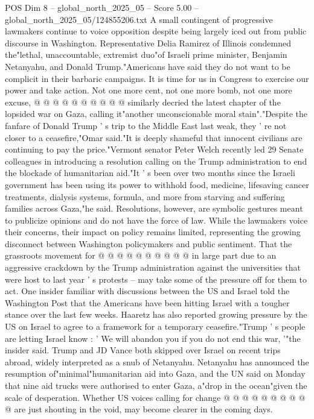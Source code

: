 \begin{textsample}{POS Dim 8 – global\_north\_2025\_05 – Score 5.00 – global\_north\_2025\_05/124855206.txt}
A small contingent of progressive lawmakers continue to voice opposition despite being largely iced out from public discourse in Washington.
Representative Delia Ramirez of Illinois condemned the"lethal, unaccountable, extremist duo"of Israeli prime minister, Benjamin Netanyahu, and Donald Trump."Americans have said they do not want to be complicit in their barbaric campaigns.
It is time for us in Congress to exercise our power and take action.
Not one more cent, not one more bomb, not one more excuse, @ @ @ @ @ @ @ @ @ @ similarly decried the latest chapter of the lopsided war on Gaza, calling it"another unconscionable moral stain"."Despite the fanfare of Donald Trump ' s trip to the Middle East last weak, they ' re not closer to a ceasefire,"Omar said."It is deeply shameful that innocent civilians are continuing to pay the price."Vermont senator Peter Welch recently led 29 Senate colleagues in introducing a resolution calling on the Trump administration to end the blockade of humanitarian aid."It ' s been over two months since the Israeli government has been using its power to withhold food, medicine, lifesaving cancer treatments, dialysis systems, formula, and more from starving and suffering families across Gaza,"he said.
Resolutions, however, are symbolic gestures meant to publicize opinions and do not have the force of law.
While the lawmakers voice their concerns, their impact on policy remains limited, representing the growing disconnect between Washington policymakers and public sentiment.
That the grassroots movement for @ @ @ @ @ @ @ @ @ @ in large part due to an aggressive crackdown by the Trump administration against the universities that were host to last year ' s protests -- may take some of the pressure off for them to act.
One insider familiar with discussions between the US and Israel told the Washington Post that the Americans have been hitting Israel with a tougher stance over the last few weeks.
Haaretz has also reported growing pressure by the US on Israel to agree to a framework for a temporary ceasefire."Trump ' s people are letting Israel know : ' We will abandon you if you do not end this war, '"the insider said.
Trump and JD Vance both skipped over Israel on recent trips abroad, widely interpreted as a snub of Netanyahu.
Netanyahu has announced the resumption of"minimal"humanitarian aid into Gaza, and the UN said on Monday that nine aid trucks were authorised to enter Gaza, a"drop in the ocean"given the scale of desperation.
Whether US voices calling for change @ @ @ @ @ @ @ @ @ @ are just shouting in the void, may become clearer in the coming days.

\end{textsample}
